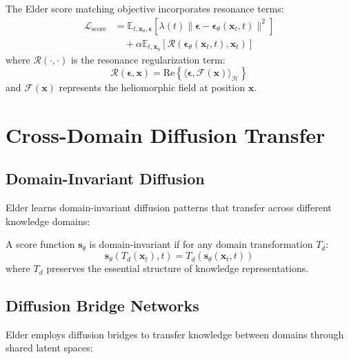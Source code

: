 \begin{theorem}
The Elder score matching objective incorporates resonance terms:
\begin{align}
\mathcal{L}_{\text{score}} &= \mathbb{E}_{t,\mathbf{x}_0,\boldsymbol{\epsilon}} \left[ \lambda(t) \|\boldsymbol{\epsilon} - \boldsymbol{\epsilon}_\theta(\mathbf{x}_t, t)\|^2 \right] \\
&\quad + \alpha \mathbb{E}_{t,\mathbf{x}_0} \left[ \mathcal{R}(\boldsymbol{\epsilon}_\theta(\mathbf{x}_t, t), \mathbf{x}_t) \right]
\end{align}
where $\mathcal{R}(\cdot, \cdot)$ is the resonance regularization term:
\begin{equation}
\mathcal{R}(\boldsymbol{\epsilon}, \mathbf{x}) = \text{Re}\left\{ \langle \boldsymbol{\epsilon}, \mathcal{F}(\mathbf{x}) \rangle_{\mathcal{H}} \right\}
\end{equation}
and $\mathcal{F}(\mathbf{x})$ represents the heliomorphic field at position $\mathbf{x}$.
\end{theorem}

\section{Cross-Domain Diffusion Transfer}

\subsection{Domain-Invariant Diffusion}

Elder learns domain-invariant diffusion patterns that transfer across different knowledge domains:

\begin{definition}
A score function $\mathbf{s}_\theta$ is domain-invariant if for any domain transformation $T_d$:
\begin{equation}
\mathbf{s}_\theta(T_d(\mathbf{x}_t), t) = T_d(\mathbf{s}_\theta(\mathbf{x}_t, t))
\end{equation}
where $T_d$ preserves the essential structure of knowledge representations.
\end{definition}

\subsection{Diffusion Bridge Networks}

Elder employs diffusion bridges to transfer knowledge between domains through shared latent spaces:

